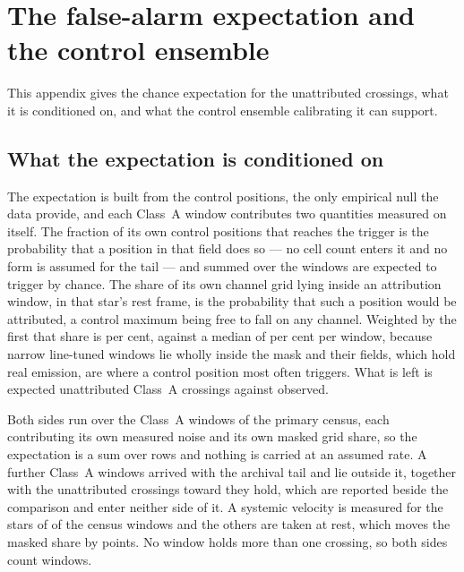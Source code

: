 \section{The false-alarm expectation and the control ensemble}
\label{app:falsealarm}

This appendix gives the chance expectation for the unattributed crossings,
what it is conditioned on, and what the control ensemble calibrating it can
support.

\subsection{What the expectation is conditioned on}

The expectation is built from the control positions, the only empirical null
the data provide, and each Class~A window contributes two quantities
measured on itself. The fraction of its own \NCtrl{} control positions that
reaches the trigger is the probability that a position in that field does so
--- no cell count enters it and no form is assumed for the tail --- and
summed over the windows \CeExpTrig{} are expected to trigger by chance. The
share of its own channel grid lying inside an attribution window, in that
star's rest frame, is the probability that such a position would be
attributed, a control maximum being free to fall on any channel. Weighted by
the first that share is \CeMaskPct{} per cent, against a median of
\CeMaskPctMed{} per cent per window, because \CeNFullMask{} narrow
line-tuned windows lie wholly inside the mask and their fields, which hold
real emission, are where a control position most often triggers. What is
left is \CeExp{} expected unattributed Class~A crossings against \CeObs{}
observed.

Both sides run over the \CeNWin{} Class~A windows of the primary census, each
contributing its own measured noise and its own masked grid share, so the
expectation is a sum over rows and nothing is carried at an assumed rate. A
further \CeNWinTail{} Class~A windows arrived with the archival tail and lie
outside it, together with the \CeNTailCrossWord{} unattributed crossings
toward \CeTailStar{} they hold, which are reported beside the comparison and
enter neither side of it. A systemic velocity is measured for the stars of
\CeNVsys{} of the census windows and the others are taken at rest, which
moves the masked share by \CeVsysSensPct{} points. No window holds more than
one crossing, so both sides count windows.

